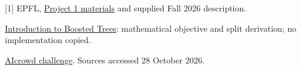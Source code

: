 \documentclass[10pt,a4paper]{article}
\begin{document}
\small
[1] EPFL, \href{https://github.com/epfml/ML_course/tree/main/projects/project1}{Project 1 materials} and supplied Fall 2026 description.\par
[2] \href{https://xgboost.readthedocs.io/en/stable/tutorials/model.html}{Introduction to Boosted Trees}: mathematical objective and split derivation; no implementation copied.\par
[3] \href{https://www.aicrowd.com/challenges/epfl-machine-learning-project-1}{AIcrowd challenge}. Sources accessed 28 October 2026.
\end{document}
